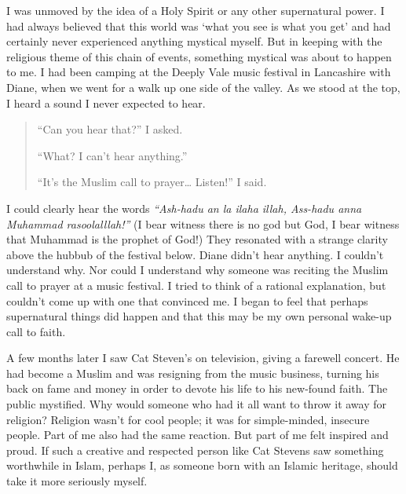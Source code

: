 \documentclass[12pt]{memoir}
\begin{document}
I was unmoved by the idea of a Holy Spirit or any other supernatural power.
I had always believed that this world was ‘what you see is what you get’
and had certainly never experienced anything mystical myself.
But in keeping with the religious theme of this chain of events,
something mystical was about to happen to me.
I had been camping at the Deeply Vale music festival in Lancashire with Diane,
when we went for a walk up one side of the valley.
As we stood at the top, I heard a sound I never expected to hear.

\begin{quote}
“Can you hear that?” I asked.

“What? I can’t hear anything.”

“It’s the Muslim call to prayer… Listen!” I said.
\end{quote}

I could clearly hear the words
\emph{“Ash-hadu an la ilaha illah, Ass-hadu anna Muhammad rasoolalllah!”}
(I bear witness there is no god but God, I bear witness
that Muhammad is the prophet of God!)
They resonated with a strange clarity above the hubbub of the festival below.
Diane didn’t hear anything.
I couldn’t understand why.
Nor could I understand why someone was reciting
the Muslim call to prayer at a music festival.
I tried to think of a rational explanation,
but couldn’t come up with one that convinced me.
I began to feel that perhaps supernatural things did happen
and that this may be my own personal wake-up call to faith.

A few months later I saw Cat Steven’s on television,
giving a farewell concert.
He had become a Muslim and was resigning from the music business,
turning his back on fame and money
in order to devote his life to his new-found faith.
The public  mystified.
Why would someone who had it all want to throw it away for religion?
Religion wasn’t for cool people; it was for simple-minded, insecure people.
Part of me also had the same reaction.
But part of me felt inspired and proud.
If such a creative and respected person like Cat Stevens
saw something worthwhile in Islam, perhaps I,
as someone born with an Islamic heritage,
should take it more seriously myself.
\end{document}
